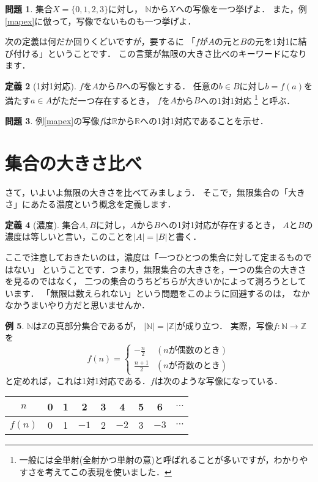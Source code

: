 \documentclass[./main]{subfiles} %
\theoremstyle{definition}
\newtheorem{hamadadefi}{定義}[section]
\newtheorem{hamadaex}[hamadadefi]{例}
\newtheorem{hamadaqst}[hamadadefi]{問題}
\begin{document}
\begin{hamadaqst}
\label{mapq}
集合$X=\{0,1,2,3\}$に対し，
$\mathbb{N}$から$X$への写像を一つ挙げよ．
また，例\ref{mapex}に倣って，写像でないものも一つ挙げよ．
\end{hamadaqst}

次の定義は何だか回りくどいですが，要するに
「$f$が$A$の元と$B$の元を1対1に結び付ける」ということです．
この言葉が無限の大きさ比べのキーワードになります．

\begin{hamadadefi}[1対1対応]
$f$を$A$から$B$への写像とする．
任意の$b\in B$に対し$b=f(a)$を満たす$a\in A$がただ一つ存在するとき，
$f$を$A$から$B$への1対1対応
\footnote{一般には全単射(全射かつ単射の意)と呼ばれることが多いですが，わかりやすさを考えてこの表現を使いました．}
と呼ぶ．
\end{hamadadefi}

\begin{hamadaqst}
\label{bijecq}
例\ref{mapex}の写像$f$は$\mathbb{R}$から$\mathbb{R}$への1対1対応であることを示せ．
\end{hamadaqst}

\section{集合の大きさ比べ}
さて，いよいよ無限の大きさを比べてみましょう．
そこで，無限集合の「大きさ」にあたる濃度という概念を定義します．

\begin{hamadadefi}[濃度]
集合$A,B$に対し，$A$から$B$への1対1対応が存在するとき，
$A$と$B$の濃度は等しいと言い，このことを$|A|=|B|$と書く．
\end{hamadadefi}

ここで注意しておきたいのは，濃度は「一つひとつの集合に対して定まるものではない」
ということです．つまり，無限集合の大きさを，一つの集合の大きさを見るのではなく，
二つの集合のうちどちらが大きいかによって測ろうとしています．
「無限は数えられない」という問題をこのように回避するのは，
なかなかうまいやり方だと思いませんか．

\begin{hamadaex}
\label{NandZ}
$\mathbb{N}$は$\mathbb{Z}$の真部分集合であるが，
$|\mathbb{N}|=|\mathbb{Z}|$が成り立つ．
実際，写像$f\colon\mathbb{N}\to\mathbb{Z}$を
\[
f(n)=
\begin{cases}
-\frac{n}{2} & (nが偶数のとき) \\
\frac{n+1}{2} & (nが奇数のとき)
\end{cases}
\]
と定めれば，これは1対1対応である．$f$は次のような写像になっている．
\begin{table}[h]
\centering
\begin{tabular}{c||c|c|c|c|c|c|c|c}
$n$&0&1&2&3&4&5&6&$\cdots$ \\\hline
$f(n)$&0&1&$-1$&2&$-2$&3&$-3$&$\cdots$
\end{tabular}
\end{table}
\end{hamadaex}
\end{document}
